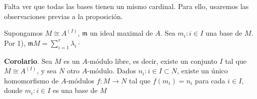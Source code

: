 \documentclass[a4paper,12pt]{article}
\theoremstyle{definition}
\begin{document}
Falta ver que todas las bases tienen un mismo cardinal. Para ello, usaremos las observaciones previas a la proposición.

Supongamos $M\cong A^{(I)}$, $\mathfrak{m}$ un ideal maximal de $A$. Sea ${m_i:i\in I}$ una base de $M$. Por 1), $\mathfrak{m}M={\sum_{i=1}^r \lambda_i\cdot}$

\textbf{Corolario}. Sea $M$ es un $A$-módulo libre, es decir, existe un conjunto $I$ tal que $M\cong A^{(I)}$, y sea $N$ otro $A$-módulo. Dados ${n_i:i\in I}\subset N$, existe un único homomorfismo de $A$-módulos $f:M\rightarrow N$ tal que $f(m_i)=n_i$ para cada $i\in I$, donde ${m_i: i\in I}$ es una base de $M$
\end{document}
